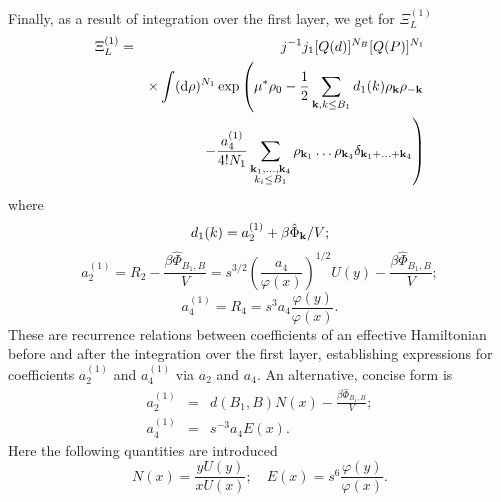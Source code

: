 Finally, as a result of integration over the first layer, we get for $\Xi_L^{(1)}$
\begin{eqnarray}
	\Xi_L^{(1)} & = & j^{-1}j_1 [Q(d)]^{N_B} [Q(P)]^{N_1} 
	\\
	&& \times 
	\int ({\rm d} \rho)^{N_1} \exp
	\left(
		\mu^*\rho_0 - \frac{1}{2} \sum_{\vb k, k \leq B_1} d_1(k) \rho_{\vb k} \rho_{-\vb k}
	\right.
	\nonumber \\
	&& 
	\left.
		- \frac{a_4^{(1)}}{4!N_1} \sum_{\substack{\vb k_1, \dotsc, \vb k_4 \\ k_i \leq B_1}}
		\rho_{\vb k_1} \dotsc \rho_{\vb k_4} \delta_{\vb{k}_1 + \dotsc + \vb{k}_4}
	\right)
	\nonumber
\end{eqnarray}
where
\begin{equation*}
	d_1(k) = a_2^{(1)} + \beta\hat{\Phi}_{\vb k} / V;
\end{equation*}
\begin{equation*}
	a_2^{(1)} = R_2 - \frac{\beta\hat{\Phi}_{B_1, B}}{V} = s^{3/2} \left(\frac{a_4}{\varphi(x)}\right)^{1/2} U(y)
	- \frac{\beta\hat{\Phi}_{B_1, B}}{V};
\end{equation*}
\begin{equation*}
	a_4^{(1)} = R_4 = s^3 a_4 \frac{\varphi(y)}{\varphi(x)}.
\end{equation*}
These are recurrence relations between coefficients of an effective Hamiltonian before and after the integration over the first layer, establishing expressions for coefficients $a_2^{(1)}$ and $a_4^{(1)}$ via $a_2$ and $a_4$. An alternative, concise form is
\begin{eqnarray}
	a_2^{(1)} & = & d(B_1, B) N(x) - \frac{\beta\hat{\Phi}_{B_1, B}}{V};
	\\
	a_4^{(1)} & = & s^{-3} a_4 E(x).
\end{eqnarray}
Here the following quantities are introduced
\begin{equation*}
	N(x) = \frac{y U(y)}{x U(x)}; \quad E(x) = s^6 \frac{\varphi(y)}{\varphi(x)}.
\end{equation*}
